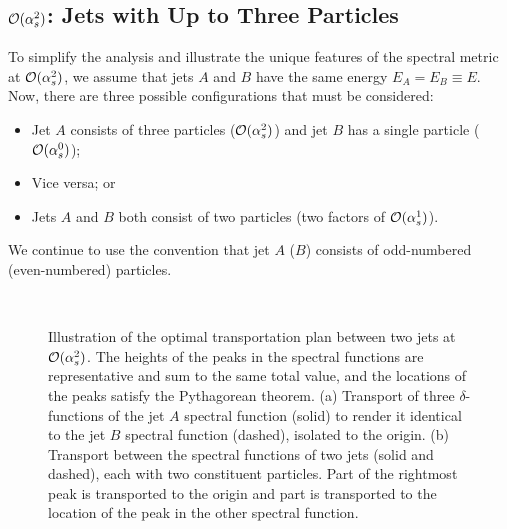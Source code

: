 \documentclass[letterpaper,11pt]{article}
\begin{document}
\subsection{${\cal O}(\alpha_s^2)$: Jets with Up to Three Particles}
\label{sec:uptothree}


To simplify the analysis and illustrate the unique features of the spectral metric at ${\cal O}(\alpha_s^2)$, we assume that jets $A$ and $B$ have the same energy $E_A=E_B\equiv E$.
%
Now, there are three possible configurations that must be considered:
%
\begin{itemize}
\item Jet $A$ consists of three particles (${\cal O}(\alpha_s^2)$) and jet $B$ has a single particle (${\cal O}(\alpha_s^0)$);
\item Vice versa; or 
\item Jets $A$ and $B$ both consist of two particles (two factors of ${\cal O}(\alpha_s^1)$).
\end{itemize}
%
We continue to use the convention that jet $A$ ($B$) consists of odd-numbered (even-numbered) particles.


\begin{figure}[t!]
\begin{center}
    \ \ \ \ \ \ 
\caption{\label{fig:3moves0}
%
Illustration of the optimal transportation plan between two jets at ${\cal O}(\alpha_s^2)$.
%
The heights of the peaks in the spectral functions are representative and sum to the same total value, and the locations of the peaks satisfy the Pythagorean theorem.
%
(a) Transport of three $\delta$-functions of the jet $A$ spectral function (solid) to render it identical to the jet $B$ spectral function (dashed), isolated to the origin.
%
(b) Transport between the spectral functions of two jets (solid and dashed), each with two constituent particles.
%
Part of the rightmost peak is transported to the origin and part is transported to the location of the peak in the other spectral function.
}
\end{center}
\end{figure}
\end{document}
